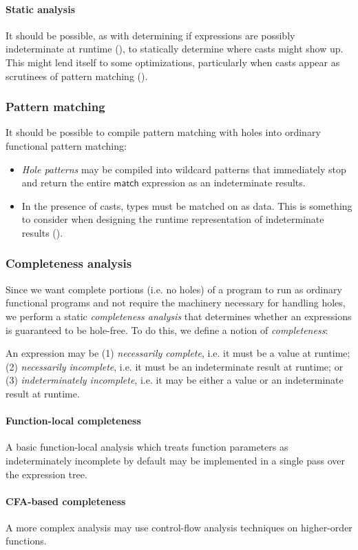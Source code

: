 \documentclass[index.tex]{subfiles}
\begin{document}
\paragraph{Static analysis}
It should be possible, as with determining if expressions are possibly indeterminate at runtime
(), to statically determine where casts might show up. This might lend
itself to some optimizations, particularly when casts appear as scrutinees of pattern matching
().

\subsubsection{Pattern matching}
\label{pattern-matching}
It should be possible to compile pattern matching with holes into ordinary functional pattern
matching:
\begin{itemize}
  \item \emph{Hole patterns} may be compiled into wildcard patterns that immediately stop and return
    the entire $\textsf{match}$ expression as an indeterminate results.
  \item In the presence of casts, types must be matched on as data. This is something to consider
    when designing the runtime representation of indeterminate results
    ().
\end{itemize}

\subsubsection{Completeness analysis}
\label{completeness-analysis}
Since we want complete portions (i.e. no holes) of a program to run as ordinary functional programs
and not require the machinery necessary for handling holes, we perform a static \emph{completeness
analysis} that determines whether an expressions is guaranteed to be hole-free. To do this, we
define a notion of \emph{completeness}:
%
\begin{definition}[name=Completeness]
  An expression may be (1) \emph{necessarily complete}, i.e. it must be a value at runtime; (2)
  \emph{necessarily incomplete}, i.e. it must be an indeterminate result at runtime; or (3)
  \emph{indeterminately incomplete}, i.e. it may be either a value or an indeterminate result at
  runtime.
\end{definition}
%

\paragraph{Function-local completeness}
A basic function-local analysis which treats function parameters as indeterminately
incomplete by default may be implemented in a single pass over the expression tree.

\paragraph{CFA-based completeness}
A more complex analysis may use control-flow analysis techniques on higher-order functions.
\end{document}
